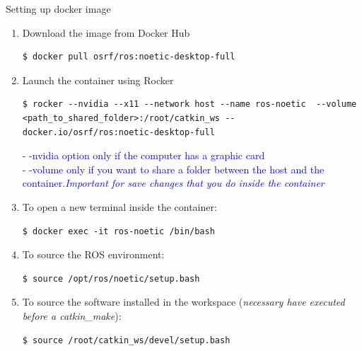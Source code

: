 \begin{frame}{Setting up docker image}

\begin{enumerate}
    \item Download the image from Docker Hub
\begin{lstlisting}[language=shell]
$ docker pull osrf/ros:noetic-desktop-full
\end{lstlisting}
    \item Launch the container using Rocker
\begin{lstlisting}[language=shell]
$ rocker --nvidia --x11 --network host --name ros-noetic  --volume <path_to_shared_folder>:/root/catkin_ws -- docker.io/osrf/ros:noetic-desktop-full
\end{lstlisting}
\textcolor{blue}{- -nvidia option only if the computer has a graphic card}\\
\textcolor{blue}{- -volume only if you want to share a folder between the host and the container.\textit{Important for save changes that you do inside the container}}
    \item To open a new terminal inside the container:
\begin{lstlisting}[language=shell]
$ docker exec -it ros-noetic /bin/bash 
\end{lstlisting}    
\newpage
\item To source the ROS environment:
\begin{lstlisting}[language=shell]
$ source /opt/ros/noetic/setup.bash
\end{lstlisting}  
\item To source the software installed in the workspace (\textit{necessary have executed before a catkin\_make}):
\begin{lstlisting}[language=shell]
$ source /root/catkin_ws/devel/setup.bash
\end{lstlisting}  
    
\end{enumerate}
\end{frame}

